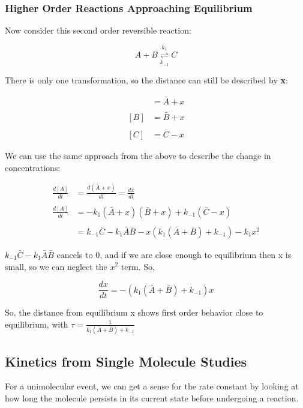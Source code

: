 \documentclass[12pt, letterpaper]{article}
\begin{document}
\subsubsection*{Higher Order Reactions Approaching Equilibrium}

Now consider this second order reversible reaction:

\begin{equation*}
    A + B \stackrel{k_1}{\underset{k_{-1}}{\rightleftharpoons}} C
\end{equation*}

There is only one transformation, so the distance can still be described by \textbf{x}:

\begin{align*}
    [A] &= \bar{A} + x \\ \\ 
    [B] &= \bar{B} + x \\ \\
    [C] &= \bar{C} - x
\end{align*}

We can use the same approach from the above to describe the change in concentrations: 

\begin{align*}
    \frac{d[A]}{dt} &= \frac{d(\bar{A} + x)}{dt} = \frac{dx}{dt} \\ \\
    \frac{d[A]}{dt} &= -k_1(\bar{A} + x)(\bar{B} + x) + k_{-1}(\bar{C} - x) \\ \\ 
    &= k_{-1}\bar{C} - k_1\bar{A}\bar{B} - x(k_1(\bar{A} + \bar{B}) + k_{-1}) - k_1x^2
\end{align*}

\( k_{-1}\bar{C} - k_1\bar{A}\bar{B} \) cancels to 0, and if we are close enough to equilibrium then x is small, so we can neglect the $x^2$ term. 
So, 

\begin{equation}
    \frac{dx}{dt} = -(k_1(\bar{A} + \bar{B}) + k_{-1})x
\end{equation}

So, the distance from equilibrium x shows first order behavior close to equilibrium, with \( \tau = \frac{1}{k_1(\bar{A} + \bar{B}) + k_{-1}} \)

\newpage

\subsection*{Kinetics from Single Molecule Studies}
For a unimolecular event, we can get a sense for the rate constant by looking at how long the molecule
persists in its current state before undergoing a reaction. 
\end{document}
